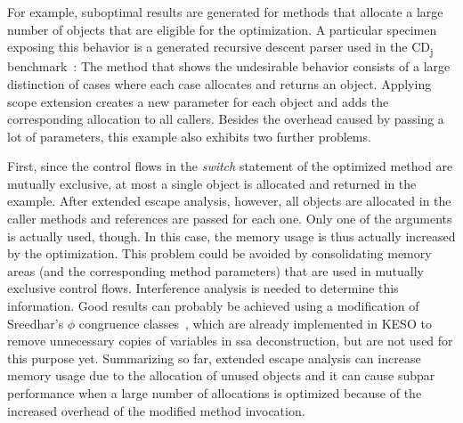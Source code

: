 		For example, suboptimal results are generated for methods that allocate a large number of objects that are eligible
		for the optimization. A particular specimen exposing this behavior is a generated recursive descent parser used in
		the CD\textsubscript{j} benchmark~\cite{kalibera:09:jtres}: The method that shows the undesirable behavior consists
		of a large distinction of cases where each case allocates and returns an object. Applying scope extension creates
		a new parameter for each object and adds the corresponding allocation to all callers. Besides the overhead caused by
		passing a lot of parameters, this example also exhibits two further problems.

		First, since the control flows in the \emph{switch} statement of the optimized method are mutually exclusive, at
		most a single object is allocated and returned in the example. After extended escape analysis, however, all objects
		are allocated in the caller methods and references are passed for each one. Only one of the arguments is actually
		used, though. In this case, the memory usage is thus actually increased by the optimization. This problem could be
		avoided by consolidating memory areas (and the corresponding method parameters) that are used in mutually exclusive
		control flows. Interference analysis is needed to determine this information. Good results can probably be achieved
		using a modification of Sreedhar's $\phi$ congruence classes~\cite{sreedhar:99:sas}, which are already implemented
		in KESO to remove unnecessary copies of variables in \gls{ssa} deconstruction, but are not used for this purpose
		yet. Summarizing so far, extended escape analysis can increase memory usage due to the allocation of unused objects
		and it can cause subpar performance when a large number of allocations is optimized because of the increased
		overhead of the modified method invocation.

